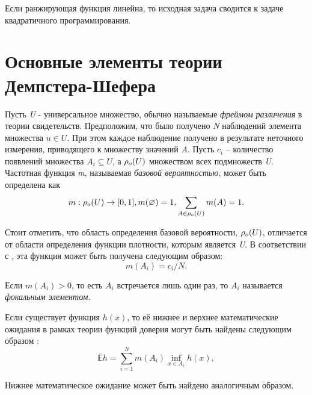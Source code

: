 \documentclass[12pt,a4paper,oneside]{article}
\begin{document}
\begin{multicols}{2}
Если ранжирующая функция линейна, то исходная задача сводится к задаче квадратичного программирования.


\vspace*{1em}
\chapter{Основные элементы теории Демпстера-Шефера}

\par
Пусть \emph{U} - универсальное множество, обычно называемые \emph{фреймом различения} в теории свидетельств. 
Предположим, что было получено \emph{N} наблюдений элемента множества \(u \in U\).
При этом каждое наблюдение получено в результате неточного измерения, приводящего к множеству значений \emph{A}.
Пусть \(c_i\) -- количество появлений множества \(A_i \subseteq U\), а \(\mathrm{\rho}_o(U)\) множеством всех подмножеств \emph{U}.
Частотная функция \emph{m}, называемая \emph{базовой вероятностью}, может быть определена как 
\[
m : \mathrm{\rho}_o(U) \to [0,1], 
m(\varnothing) = 1, 
\sum \limits_{A \in \mathrm{\rho}_o(U)} m(A) = 1.
\]

\par
Стоит отметить, что область определения базовой вероятности, \(\mathrm{\rho}_o(U)\), отличается от области определения функции плотности, которым является \emph{U}. 
В соответствии с , эта функция может быть получена следующим образом:
\[
m(A_i) = c_i / N.
\]

\par
Если \(m(A_i) > 0\), то есть \(A_i\) встречается лишь один раз, то \(A_i\) называется \emph{фокальным элементом}. 

\par
Если существует функция \(h(x)\), то её нижнее и верхнее математические ожидания в рамках теории функций доверия могут быть найдены следующим образом :
\[
\mathbb{\overline{E}} h = \sum \limits_{i=1}^N m(A_i) \inf_{x \in A_i} h(x), \]

\par
Нижнее математическое ожидание может быть найдено аналогичным образом. 


\vspace*{1em}

\end{multicols}
\end{document}
